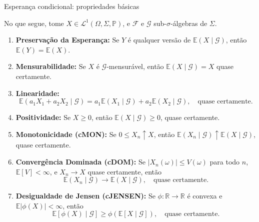 \documentclass[11pt]{beamer}
\begin{document}
	\begin{frame}{Esperança condicional: propriedades básicas}
	
			No que segue, tome $X \in \mathcal{L}^1(\Omega,\Sigma,\mathbb{P})$, e $\mathcal{F}$ e $\mathcal{G}$ sub-$\sigma$-álgebras de $\Sigma$.
	\begin{lemma}
			\begin{enumerate}
			\item \textbf{Preservação da Esperança:}  
			Se \( Y \) é qualquer versão de \( \mathbb{E}(X \mid \mathcal{G}) \), então \( \mathbb{E}(Y) = \mathbb{E}(X) \).
			
			\item \textbf{Mensurabilidade:}  
			Se \( X \) é \( \mathcal{G} \)-mensurável, então \( \mathbb{E}(X \mid \mathcal{G}) = X \) quase certamente.
			
			\item \textbf{Linearidade:}
			\[
			\mathbb{E}(a_1 X_1 + a_2 X_2 \mid \mathcal{G}) = a_1 \mathbb{E}(X_1 \mid \mathcal{G}) + a_2 \mathbb{E}(X_2 \mid \mathcal{G}), \quad \text{quase certamente.}
			\]
			
			\item \textbf{Positividade:}  
			Se \( X \geq 0 \), então \( \mathbb{E}(X \mid \mathcal{G}) \geq 0 \), quase certamente.
			
			\item \textbf{Monotonicidade (cMON):}  
			Se \( 0 \leq X_n \uparrow X \), então \( \mathbb{E}(X_n \mid \mathcal{G}) \uparrow \mathbb{E}(X \mid \mathcal{G}) \), quase certamente.
			
			\item \textbf{Convergência Dominada (cDOM):}  
			Se \( |X_n(\omega)| \leq V(\omega) \) para todo \( n \), \( \mathbb{E}[V] < \infty \), e \( X_n \to X \) quase certamente, então
			\[
			\mathbb{E}(X_n \mid \mathcal{G}) \to \mathbb{E}(X \mid \mathcal{G}), \quad \text{quase certamente.}
			\]
			
			\item \textbf{Desigualdade de Jensen (cJENSEN):}  
			Se \( \phi: \mathbb{R} \to \mathbb{R} \) é convexa e \( \mathbb{E}|\phi(X)| < \infty \), então
			\[
			\mathbb{E}[\phi(X) \mid \mathcal{G}] \geq \phi(\mathbb{E}[X \mid \mathcal{G}]), \quad \text{quase certamente.}
			\]
		\end{enumerate}
	\end{lemma}
		
				
							
				\end{frame}
	
\end{document}

